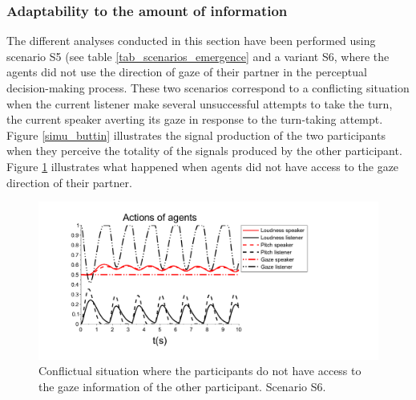 \subsubsection{Adaptability to the amount of information}

The different analyses conducted in this section have been performed using scenario S5 (see table \ref{tab_scenarios_emergence} and a variant S6, where the agents did not use the direction of gaze of their partner in the perceptual decision-making process. 
These two scenarios correspond to a conflicting situation when the current listener make several unsuccessful attempts to take the turn, the current speaker averting its gaze in response to the turn-taking attempt. Figure \ref{simu_buttin} illustrates the signal production of the two participants when they perceive the totality of the signals produced by the other participant.  Figure \ref{adapt_nogaze} illustrates what happened when agents did not have access to the gaze direction of their partner. 



\begin{figure}
  \centering
  \includegraphics[width=\linewidth]{figure/adapt_nogaze.pdf}
  \caption{Conflictual situation where the participants do not have access to the gaze information of the other participant. Scenario S6.}
  \label{adapt_nogaze}
\end{figure}

